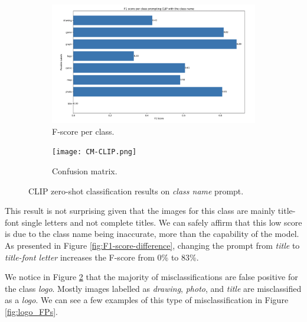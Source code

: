 \begin{figure}[ht]
    \centering
    \begin{subfigure}{0.47\textwidth}
        \includegraphics[width=\linewidth]{Images/CLIP-results/F1-score-CLIP-p0.png}
        \caption{F-score per class.}
        \label{fig:CLIP-zero-shot-class-name-A}
    \end{subfigure}
    \begin{subfigure}{0.47\textwidth}
        \texttt{[image: CM-CLIP.png]}
        \caption{Confusion matrix.}
        \label{fig:CLIP-zero-shot-class-name-B}
    \end{subfigure}
    \caption{CLIP zero-shot classification results on \textit{class name} prompt.}
    \label{fig:CLIP-zero-shot-class-name}
\end{figure}


This result is not surprising given that the images for this class are mainly title-font single letters and not complete titles. We can safely affirm that this low score is due to the class name being inaccurate, more than the capability of the model. As presented in Figure \ref{fig:F1-score-difference}, changing the prompt from \textit{title} to \textit{title-font letter} increases the F-score from 0\% to 83\%.


We notice in Figure \ref{fig:CLIP-zero-shot-class-name-B} that the majority of misclassifications are false positive for the class \textit{logo}. Mostly images labelled as \textit{drawing}, \textit{photo}, and \textit{title} are misclassified as a \textit{logo}. We can see a few examples of this type of misclassification in Figure \ref{fig:logo_FPs}.

\clearpage


